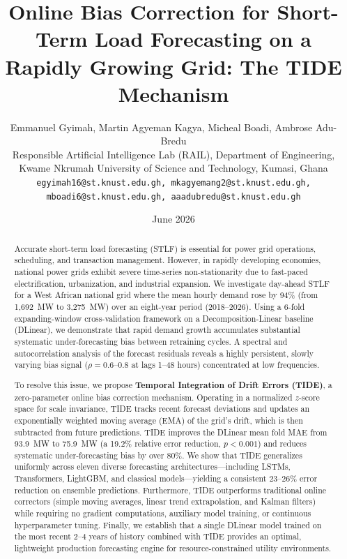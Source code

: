 \documentclass[11pt,letterpaper]{article}
\title{\Large\bf Online Bias Correction for Short-Term Load Forecasting on a Rapidly Growing Grid: The TIDE Mechanism}
\author{
  Emmanuel Gyimah, Martin Agyeman Kagya,
  Micheal Boadi, Ambrose Adu-Bredu \\[4pt]
  Responsible Artificial Intelligence Lab (RAIL), Department of Engineering,\\
  Kwame Nkrumah University of Science and Technology, Kumasi, Ghana \\[4pt]
  \texttt{egyimah16@st.knust.edu.gh, mkagyemang2@st.knust.edu.gh,} \\
  \texttt{mboadi6@st.knust.edu.gh, aaadubredu@st.knust.edu.gh}
}
\date{June 2026}
\begin{document}
\maketitle

\begin{abstract}
Accurate short-term load forecasting (STLF) is essential for power grid operations, scheduling, and transaction management. However, in rapidly developing economies, national power grids exhibit severe time-series non-stationarity due to fast-paced electrification, urbanization, and industrial expansion. We investigate day-ahead STLF for a West African national grid where the mean hourly demand rose by 94\% (from 1,692~MW to 3,275~MW) over an eight-year period (2018--2026). Using a 6-fold expanding-window cross-validation framework on a Decomposition-Linear baseline (DLinear), we demonstrate that rapid demand growth accumulates substantial systematic under-forecasting bias between retraining cycles. A spectral and autocorrelation analysis of the forecast residuals reveals a highly persistent, slowly varying bias signal ($\rho = 0.6$--$0.8$ at lags 1--48 hours) concentrated at low frequencies.

To resolve this issue, we propose \textbf{Temporal Integration of Drift Errors (TIDE)}, a zero-parameter online bias correction mechanism. Operating in a normalized $z$-score space for scale invariance, TIDE tracks recent forecast deviations and updates an exponentially weighted moving average (EMA) of the grid's drift, which is then subtracted from future predictions. TIDE improves the DLinear mean fold MAE from 93.9~MW to 75.9~MW (a 19.2\% relative error reduction, $p < 0.001$) and reduces systematic under-forecasting bias by over 80\%. We show that TIDE generalizes uniformly across eleven diverse forecasting architectures---including LSTMs, Transformers, LightGBM, and classical models---yielding a consistent 23--26\% error reduction on ensemble predictions. Furthermore, TIDE outperforms traditional online correctors (simple moving averages, linear trend extrapolation, and Kalman filters) while requiring no gradient computations, auxiliary model training, or continuous hyperparameter tuning. Finally, we establish that a single DLinear model trained on the most recent 2--4 years of history combined with TIDE provides an optimal, lightweight production forecasting engine for resource-constrained utility environments.
\end{abstract}
\end{document}
